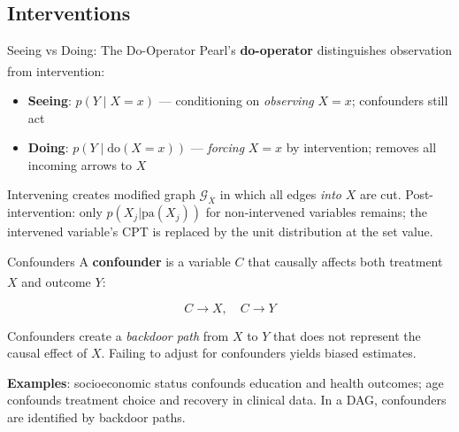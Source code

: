     \subsection{Interventions}

\begin{v3topic}{Seeing vs Doing: The Do-Operator}
    Pearl’s \textbf{do-operator} distinguishes observation from
    intervention:\textsuperscript{\cite[][pp.~50--51]{barberBayesianReasoningMachine2012}}

    \begin{itemize}
        \item \textbf{Seeing}: $p(Y \mid X{=}x)$ --- conditioning on
              \emph{observing} $X{=}x$; confounders still act
        \item \textbf{Doing}: $p(Y \mid \mathrm{do}(X{=}x))$ --- \emph{forcing}
              $X{=}x$ by intervention; removes all incoming arrows to $X$
    \end{itemize}

    Intervening creates modified graph $\mathcal{G}_{\overline{X}}$ in which
    all edges \emph{into} $X$ are cut. Post-intervention: only $p(X_j | \mathrm{pa}(X_j))$
    for non-intervened variables remains; the intervened variable’s CPT is replaced
    by the unit distribution at the set value.

\end{v3topic}
\begin{v3topic}{Confounders}
    A \textbf{confounder} is a variable $C$ that causally affects both
    treatment $X$ and outcome
    $Y$:\textsuperscript{\cite[][Ch.~7]{hernanCausalInferenceWhat2020}}

    \[ C \rightarrow X,\quad C \rightarrow Y \]

    Confounders create a \emph{backdoor path} from $X$ to $Y$ that does not
    represent the causal effect of $X$. Failing to adjust for confounders
    yields biased estimates.

    \textbf{Examples}: socioeconomic status confounds education and health
    outcomes; age confounds treatment choice and recovery in clinical data.
    In a DAG, confounders are identified by backdoor paths.

\end{v3topic}
